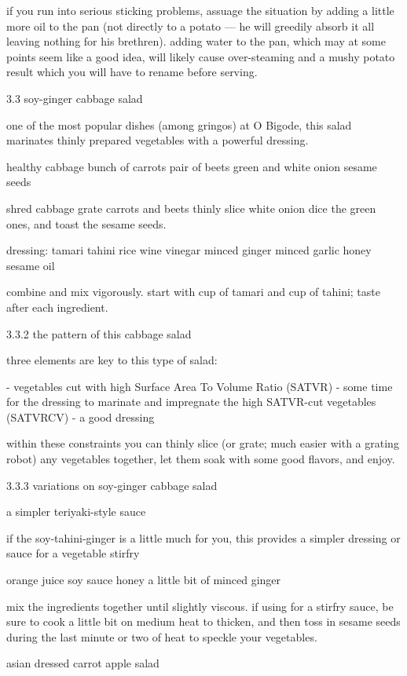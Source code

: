 if you run into serious sticking problems, assuage the situation by adding a little more oil to the pan (not directly to a potato --- he will greedily absorb it all leaving nothing for his brethren). adding water to the pan, which may at some points seem like a good idea, will likely cause over-steaming and a mushy potato result which you will have to rename before serving.

3.3 soy-ginger cabbage salad

one of the most popular dishes (among gringos) at O Bigode, this salad marinates thinly prepared vegetables with a powerful dressing.

healthy cabbage
bunch of carrots
pair of beets
green and white onion
sesame seeds

	shred cabbage
	grate carrots and beets
	thinly slice white onion
	dice the green ones,
	and toast the sesame seeds.
	
	dressing:
tamari
tahini
rice wine vinegar
minced ginger
minced garlic
honey
sesame oil

	combine and mix vigorously. start with \onethird cup of tamari and \onequarter cup of tahini; taste after each ingredient.

3.3.2 the pattern of this cabbage salad

three elements are key to this type of salad:

-	vegetables cut with high Surface Area To Volume Ratio (SATVR)
-	some time for the dressing to marinate and impregnate the high SATVR-cut vegetables (SATVRCV)
-	a good dressing

within these constraints you can thinly slice (or grate; much easier with a grating robot) any vegetables together, let them soak with some good flavors, and enjoy.

3.3.3  variations on soy-ginger cabbage salad

a simpler teriyaki-style sauce

if the soy-tahini-ginger is a little much for you, this provides a simpler dressing or sauce for a vegetable stirfry

	orange juice
	soy sauce
	honey
	a little bit of minced ginger

mix the ingredients together until slightly viscous. if using for a stirfry sauce, be sure to cook a little bit on medium heat to thicken, and then toss in sesame seeds during the last minute or two of heat to speckle your vegetables.

asian dressed carrot apple salad

